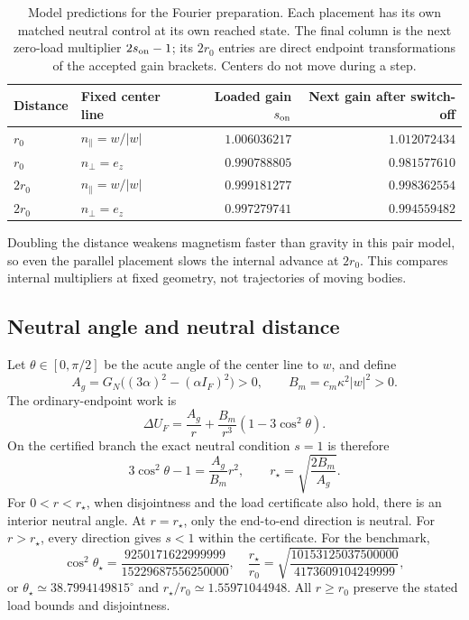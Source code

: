 \begin{table}[htbp]
\centering
\caption{Model predictions for the Fourier preparation. Each placement has its own matched neutral control at its own reached state. The final column is the next zero-load multiplier \(2s_{\rm on}-1\); its \(2r_0\) entries are direct endpoint transformations of the accepted gain brackets. Centers do not move during a step.}
\label{tab:benchmark}
\begin{tabular}{@{}llrr@{}}
\toprule
Distance & Fixed center line & Loaded gain \(s_{\rm on}\) & Next gain after switch-off\\
\midrule
\(r_0\) & \(n_\parallel=w/|w|\) & \(1.006036217\) & \(1.012072434\)\\
\(r_0\) & \(n_\perp=e_z\)       & \(0.990788805\) & \(0.981577610\)\\
\(2r_0\) & \(n_\parallel=w/|w|\) & \(0.999181277\) & \(0.998362554\)\\
\(2r_0\) & \(n_\perp=e_z\)       & \(0.997279741\) & \(0.994559482\)\\
\bottomrule
\end{tabular}
\end{table}
Doubling the distance weakens magnetism faster than gravity in this pair model, so even the parallel placement slows the internal advance at \(2r_0\). This compares internal multipliers at fixed geometry, not trajectories of moving bodies.

\subsection{Neutral angle and neutral distance}
Let \(\theta\in[0,\pi/2]\) be the acute angle of the center line to \(w\), and define
\[
 A_g=G_N\big((3\alpha)^2-(\alpha I_F)^2\big)>0,\qquad
 B_m=c_m\kappa^2|w|^2>0.
\]
The ordinary-endpoint work is
\begin{equation}
 \Delta U_F=\frac{A_g}{r}+\frac{B_m}{r^3}(1-3\cos^2\theta).
 \label{eq:neutral-work}
\end{equation}
On the certified branch the exact neutral condition \(s=1\) is therefore
\begin{equation}
 3\cos^2\theta-1=\frac{A_g}{B_m}r^2,\qquad
 r_\star=\sqrt{\frac{2B_m}{A_g}}.
 \label{eq:neutral}
\end{equation}
For \(0<r<r_\star\), when disjointness and the load certificate also hold, there is an interior neutral angle. At \(r=r_\star\), only the end-to-end direction is neutral. For \(r>r_\star\), every direction gives \(s<1\) within the certificate. For the benchmark,
\begin{equation}
 \cos^2\theta_\star=\frac{9250171622999999}{15229687556250000},
 \quad
 \frac{r_\star}{r_0}=
 \sqrt{\frac{10153125037500000}{4173609104249999}},
 \label{eq:neutral-exact}
\end{equation}
or \(\theta_\star\simeq38.7994149815^\circ\) and
\(r_\star/r_0\simeq1.55971044948\). All \(r\ge r_0\) preserve the stated load bounds and disjointness.

